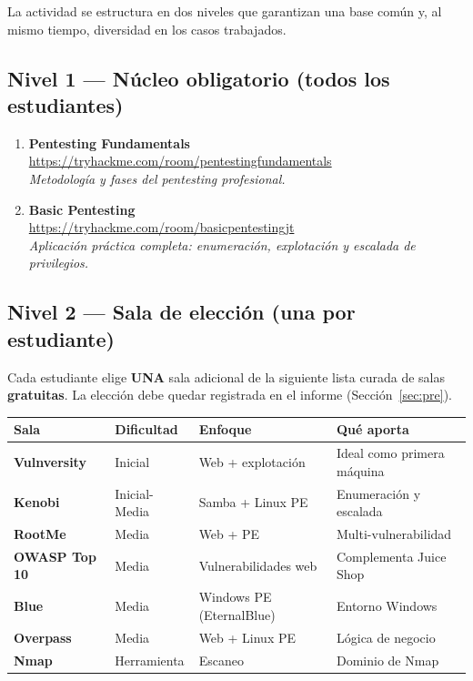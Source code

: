 \documentclass[11pt,a4paper]{article}
\begin{document}
La actividad se estructura en dos niveles que garantizan una base común y, al mismo tiempo, diversidad en los casos trabajados.

\subsection{Nivel 1 --- Núcleo obligatorio (todos los estudiantes)}
\begin{sala}
\begin{enumerate}[leftmargin=*]
  \item \textbf{Pentesting Fundamentals}\\
  \url{https://tryhackme.com/room/pentestingfundamentals}\\
  \textit{Metodología y fases del pentesting profesional.}
  
  \item \textbf{Basic Pentesting}\\
  \url{https://tryhackme.com/room/basicpentestingjt}\\
  \textit{Aplicación práctica completa: enumeración, explotación y escalada de privilegios.}
\end{enumerate}
\end{sala}

\subsection{Nivel 2 --- Sala de elección (una por estudiante)}
Cada estudiante elige \textbf{UNA} sala adicional de la siguiente lista curada de salas \textbf{gratuitas}. La elección debe quedar registrada en el informe (Sección~\ref{sec:pre}).

\begin{center}
\small
\renewcommand{\arraystretch}{1.3}
\begin{tabularx}{\textwidth}{@{} p{3cm} p{2.3cm} p{2.5cm} X @{}}
\toprule
\textbf{Sala} & \textbf{Dificultad} & \textbf{Enfoque} & \textbf{Qué aporta} \\
\midrule
\textbf{Vulnversity} & Inicial & Web + explotación & Ideal como primera máquina \\
\textbf{Kenobi} & Inicial-Media & Samba + Linux PE & Enumeración y escalada \\
\textbf{RootMe} & Media & Web + PE & Multi-vulnerabilidad \\
\textbf{OWASP Top 10} & Media & Vulnerabilidades web & Complementa Juice Shop \\
\textbf{Blue} & Media & Windows PE (EternalBlue) & Entorno Windows \\
\textbf{Overpass} & Media & Web + Linux PE & Lógica de negocio \\
\textbf{Nmap} & Herramienta & Escaneo & Dominio de Nmap \\
\bottomrule
\end{tabularx}
\end{center}
\end{document}

